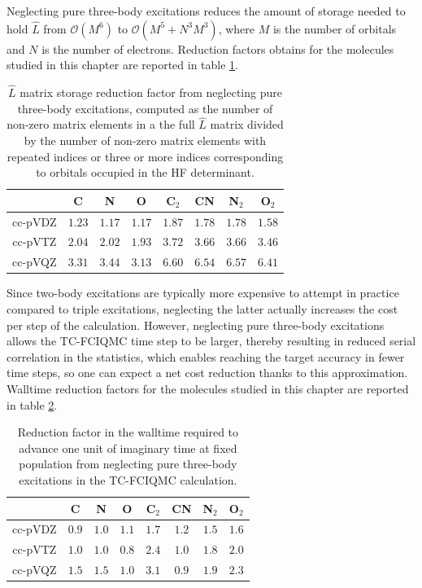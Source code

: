 Neglecting pure three-body excitations reduces the amount of storage needed to hold $\hat L$ from $\mathcal{O}(M^6)$ to $\mathcal{O}(M^5+N^3M^3)$, where $M$ is the number of orbitals and $N$ is the number of electrons. Reduction factors obtains for the molecules studied in this chapter are reported in table \ref{table:no3_memory}.

\begin{table}[htbp]
    \centering
    \begin{tabular}{cccccccc}
            & C      & N      & O      &
              C$_2$  & CN     & N$_2$  & O$_2$  \\
    \hline \hline
    cc-pVDZ & $1.23$ & $1.17$ & $1.17$ &
              $1.87$ & $1.78$ & $1.78$ & $1.58$ \\
    cc-pVTZ & $2.04$ & $2.02$ & $1.93$ &
              $3.72$ & $3.66$ & $3.66$ & $3.46$ \\
    cc-pVQZ & $3.31$ & $3.44$ & $3.13$ &
              $6.60$ & $6.54$ & $6.57$ & $6.41$ \\
    \hline
    \end{tabular}
    \caption{
      $\hat L$ matrix storage reduction factor from neglecting
      pure three-body excitations, computed as the number of
      non-zero matrix elements in a the full $\hat L$ matrix
      divided by the number of non-zero matrix elements with
      repeated indices or three or more indices corresponding to
      orbitals occupied in the HF determinant.
    }
    \label{table:no3_memory}
\end{table}

Since two-body excitations are typically more expensive to attempt in practice compared to triple excitations, neglecting the latter actually increases the cost per step of the calculation. However, neglecting pure three-body excitations allows the TC-FCIQMC time step to be larger, thereby resulting in reduced serial correlation in the statistics, which enables reaching the target accuracy in fewer time steps, so one can expect a net cost reduction thanks to this approximation. Walltime reduction factors for the molecules studied in this chapter are reported in table \ref{table:no3_cost}.
\begin{table}[htbp]
    \centering
    \begin{tabular}{cccccccc}
            & C     & N     & O     &
              C$_2$ & CN    & N$_2$ & O$_2$ \\
    \hline \hline
    cc-pVDZ & $0.9$ & $1.0$ & $1.1$ &
              $1.7$ & $1.2$ & $1.5$ & $1.6$ \\
    cc-pVTZ & $1.0$ & $1.0$ & $0.8$ &
              $2.4$ & $1.0$ & $1.8$ & $2.0$ \\
    cc-pVQZ & $1.5$ & $1.5$ & $1.0$ &
              $3.1$ & $0.9$ & $1.9$ & $2.3$ \\
    \hline
    \end{tabular}
    \caption{
      Reduction factor in the walltime required to advance one unit of
      imaginary time at fixed population from neglecting pure three-body
      excitations in the TC-FCIQMC calculation.
      \label{table:no3_cost}}
\end{table}

